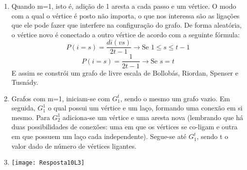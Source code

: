 \documentclass[11pt,reqno]{amsart}
\begin{document}
\begin{enumerate}
		\vspace{2cm}

		\item  Quando m=1, isto é, adição de 1 aresta a cada passo e um vértice. O modo com a qual o 
		vértice é posto não importa, o que nos interessa são as ligações que ele pode fazer que interfere 
		na configuração do grafo. De forma aleatória, o vértice novo é conectado a outro vértice de acordo 
		com a seguinte fórmula: \[P(i=s)=\frac{di(vs)}{2t-1} \rightarrow \text{Se }1 \leq s \leq t-1\]
		\[P(i=s) = \frac{1}{2t-1} \rightarrow \text{Se } s = t\] E assim se constrói um grafo de livre 
		escala de Bollobás, Riordan, Spenser e Tusnády.

		\vspace{0.3cm}

		\item Grafos com m=1, iniciam-se com $G^t_1$, sendo o mesmo um grafo vazio. Em seguida, $G^1_1$ o 
		qual possui um vértice e um laço, formando uma conexão em si mesmo. Para $G^1_2$ adiciona-se um 
		vértice e uma aresta nova (lembrando que há duas possibilidades de conexões: uma em que os vértices 
		se co-ligam e outra em que possuem um laço cada independente). Segue-se até $G^t_1$, sendo t o 
		valor dado de número de vértices ligantes. 
		\vspace{0.3cm}

		\item \begin{minipage}{\linewidth}
		\centering
		\texttt{[image: Resposta10L3]}
		\end{minipage}
		

	\end{enumerate}
\end{document}
